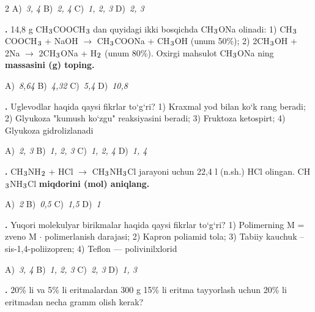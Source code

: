 \documentclass[11pt,a4paper]{article}
\renewcommand{\textsubscript}[1]{\ensuremath{_{\text{\fontsize{8}{8}\selectfont #1}}}}
\newcommand{\qn}[1]{\textbf{\fontsize{11.5}{13}\selectfont #1}}
\newcommand{\qsep}{\par\vspace{1pt}\noindent\rule{0pt}{0.4pt}\par\vspace{5pt}}
\begin{document}
\begin{multicols}{2}
\noindent A)~\textsl{3, 4} \hfill B)~\textsl{2, 4} \hfill C)~\textsl{1, 2, 3} \hfill D)~\textsl{2, 3}\par
\qsep
\noindent\qn{26.} 14,8 g CH\textsubscript{3}COOCH\textsubscript{3} dan quyidagi ikki bosqichda CH\textsubscript{3}ONa olinadi: 1) CH\textsubscript{3}COOCH\textsubscript{3} + NaOH $\to$ CH\textsubscript{3}COONa + CH\textsubscript{3}OH (unum 50\%); 2) 2CH\textsubscript{3}OH + 2Na $\to$ 2CH\textsubscript{3}ONa + H\textsubscript{2} (unum 80\%). Oxirgi mahsulot CH\textsubscript{3}ONa ning \textbf{massasini (g) toping.}

\noindent A)~\textsl{8,64} \hfill B)~\textsl{4,32} \hfill C)~\textsl{5,4} \hfill D)~\textsl{10,8}\par
\qsep
\noindent\qn{27.} Uglevodlar haqida qaysi fikrlar to`g`ri? 1) Kraxmal yod bilan ko`k rang beradi; 2) Glyukoza "kumush ko`zgu" reaksiyasini beradi; 3) Fruktoza ketospirt; 4) Glyukoza gidrolizlanadi

\noindent A)~\textsl{2, 3} \hfill B)~\textsl{1, 2, 3} \hfill C)~\textsl{1, 2, 4} \hfill D)~\textsl{1, 4}\par
\qsep
\noindent\qn{28.} CH\textsubscript{3}NH\textsubscript{2} + HCl $\to$ CH\textsubscript{3}NH\textsubscript{3}Cl jarayoni uchun 22,4 l (n.sh.) HCl olingan. CH\textsubscript{3}NH\textsubscript{3}Cl \textbf{miqdorini (mol) aniqlang.}

\noindent A)~\textsl{2} \hfill B)~\textsl{0,5} \hfill C)~\textsl{1,5} \hfill D)~\textsl{1}\par
\qsep
\noindent\qn{29.} Yuqori molekulyar birikmalar haqida qaysi fikrlar to`g`ri? 1) Polimerning M = zveno M $\cdot$ polimerlanish darajasi; 2) Kapron poliamid tola; 3) Tabiiy kauchuk -- sis-1,4-poliizopren; 4) Teflon --- polivinilxlorid

\noindent A)~\textsl{3, 4} \hfill B)~\textsl{1, 2, 3} \hfill C)~\textsl{2, 3} \hfill D)~\textsl{1, 3}\par
\qsep
\noindent\qn{30.} 20\% li va 5\% li eritmalardan 300 g 15\% li eritma tayyorlash uchun 20\% li eritmadan necha gramm olish kerak?


\end{multicols}
\end{document}
